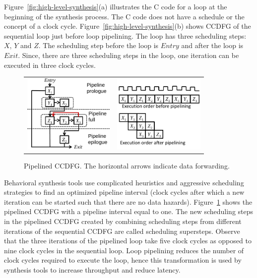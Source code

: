 Figure~\ref{fig:high-level-synthesis}(a) illustrates the C
code for a loop at the beginning of the
synthesis process. The C code does not have a schedule or the
concept of a clock cycle. Figure~\ref{fig:high-level-synthesis}(b)
shows CCDFG of the sequential loop just before loop pipelining. The loop has three scheduling steps: $X$, $Y$ and $Z$.  The scheduling step before the loop is $Entry$ and after the loop is $Exit$. Since,
there are three scheduling steps in the loop, one iteration
can be executed in three clock cycles.

\begin{figure}
\begin{center}
\begin{tabular}{cc}
\includegraphics[height=1.5in]{fig-rpe/pipelined_ccdfg}
& \hspace{0.5cm}
\includegraphics[height=1.5in]{fig-rpe/pp-clock-cycles}
\end{tabular}
\end{center}
\caption{Pipelined CCDFG. The horizontal arrows indicate data forwarding.}
\label{fig:pp-ccdfg}
\end{figure}

Behavioral synthesis tools use complicated heuristics and aggressive scheduling strategies to find an optimized pipeline interval (clock cycles after which a new iteration can be started such that there are no data hazards). Figure~\ref{fig:pp-ccdfg} shows the pipelined CCDFG with a pipeline interval equal to one. The new scheduling steps in the pipelined CCDFG created by combining scheduling steps from different iterations of the sequential CCDFG are called scheduling supersteps. Observe that the three iterations of the pipelined loop take five clock cycles as opposed to nine clock cycles in the sequential loop. Loop pipelining reduces the number of clock cycles required to execute the loop, hence this transformation is used by synthesis tools to increase throughput and reduce latency.  

